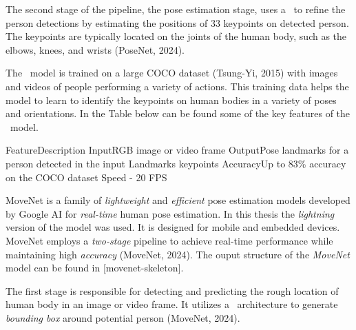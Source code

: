 The second stage of the pipeline, the pose estimation stage, uses a \CNN\ to refine the person detections by estimating the positions of 33 keypoints on detected person. The keypoints are typically located on the joints of the human body, such as the elbows, knees, and wrists (\scc PoseNet, 2024).

The \PoseNet\ model is trained on a large COCO dataset (\scc Tsung-Yi, 2015) with images and videos of people performing a variety of actions. This training data helps the model to learn to identify the keypoints on human bodies in a variety of poses and orientations. In the Table below can be found some of the key features of the \PoseNet\ model.

    \setupTABLE[r][1][style=bold]
    \setupTABLE[c][each][offset=3dd]
    \setupTABLE[frame=off]
    \setupTABLE[r][1][topframe=on,bottomframe=on]
    \setupTABLE[c][each][leftframe=on]
    \setupTABLE[c][1][leftframe=off]
    \bTR
        \bTD Feature\eTD\bTD    Description\eTD\eTR
    \bTR
        \bTD Input\eTD\bTD	    RGB image or video frame\eTD\eTR
    \bTR
            \bTD Output\eTD\bTD	    Pose landmarks for a person detected in the input\eTD\eTR
    \bTR
        \bTD Landmarks\eTD{} keypoints\eTD\eTR
    \bTR
        \bTD Accuracy\eTD\bTD	Up to 83\% accuracy on the COCO dataset\eTD\eTR
    \bTR
        \bTD Speed\eTD{} - 20 FPS\eTD\eTR


MoveNet is a family of {\em lightweight} and {\em efficient} pose estimation models developed by Google AI for {\em real-time} human pose estimation. In this thesis the {\em lightning} version of the model was used. It is designed for mobile and embedded devices. MoveNet employs a {\em two-stage} pipeline to achieve real-time performance while maintaining high {\em accuracy} (\scc MoveNet, 2024). The ouput structure of the {\em MoveNet} model can be found in [movenet-skeleton].

The first stage is responsible for detecting and predicting the rough location of human body in an image or video frame. It utilizes a \SSD\ architecture to generate {\em bounding box} around potential person (\scc MoveNet, 2024).

